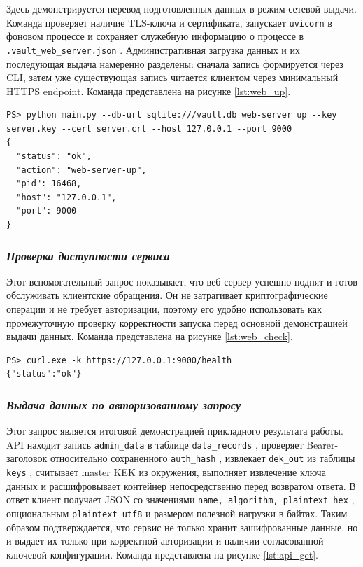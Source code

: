 \documentclass[14pt, a4paper]{extarticle}
\renewcommand{\texttt}[1]{%
  {\def\UrlFont{\ttfamily}\nolinkurl{#1}}%
}
\begin{document}
Здесь демонстрируется перевод подготовленных данных в режим сетевой выдачи. Команда проверяет наличие TLS-ключа и сертификата, запускает \texttt{uvicorn} в фоновом процессе и сохраняет служебную информацию о процессе в \texttt{.vault\_web\_server.json}. Административная загрузка данных и их последующая выдача намеренно разделены: сначала запись формируется через CLI, затем уже существующая запись читается клиентом через минимальный HTTPS endpoint. Команда представлена на рисунке \ref{lst:web_up}.



\begin{lstlisting}[style=bashcommand, caption={Запуск веб-сервера}, label=lst:web_up]
PS> python main.py --db-url sqlite:///vault.db web-server up --key server.key --cert server.crt --host 127.0.0.1 --port 9000
{
  "status": "ok",
  "action": "web-server-up",
  "pid": 16468,
  "host": "127.0.0.1",
  "port": 9000
}
\end{lstlisting}

\subsubsection*{\textit{Проверка доступности сервиса}}

Этот вспомогательный запрос показывает, что веб-сервер успешно поднят и готов обслуживать клиентские обращения. Он не затрагивает криптографические операции и не требует авторизации, поэтому его удобно использовать как промежуточную проверку корректности запуска перед основной демонстрацией выдачи данных. Команда представлена на рисунке \ref{lst:web_check}.

\begin{lstlisting}[style=bashcommand, caption={Проверка состояния веб-сервера}, label=lst:web_check]
PS> curl.exe -k https://127.0.0.1:9000/health
{"status":"ok"}
\end{lstlisting}

\subsubsection*{\textit{Выдача данных по авторизованному запросу}}

Этот запрос является итоговой демонстрацией прикладного результата работы. API находит запись \texttt{admin\_data} в таблице \texttt{data\_records}, проверяет Bearer-заголовок относительно сохраненного \texttt{auth\_hash}, извлекает \texttt{dek\_out} из таблицы \texttt{keys}, считывает master KEK из окружения, выполняет извлечение ключа данных и расшифровывает контейнер непосредственно перед возвратом ответа. В ответ клиент получает JSON со значениями \texttt{name, algorithm, plaintext\_hex}, опциональным \texttt{plaintext\_utf8} и размером полезной нагрузки в байтах. Таким образом подтверждается, что сервис не только хранит зашифрованные данные, но и выдает их только при корректной авторизации и наличии согласованной ключевой конфигурации. Команда представлена на рисунке \ref{lst:api_get}.
\end{document}
